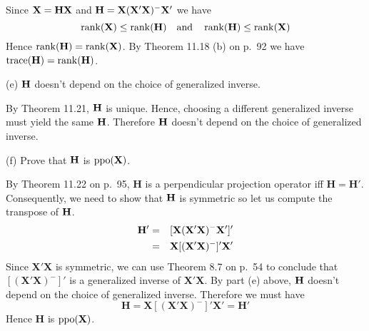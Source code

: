 \bigskip
\noindent
Since ${\bf X}={\bf HX}$ and
${\bf H}={\bf X}({\bf X}'{\bf X})^{-{}}{\bf X}'$ we have
$$
\mathop{\rm rank}({\bf X})\le
\mathop{\rm rank}({\bf H})\quad\hbox{and}\quad
\mathop{\rm rank}({\bf H})\le\mathop{\rm rank}({\bf X})
$$
Hence $\mathop{\rm rank}({\bf H})=\mathop{\rm rank}({\bf X})$.
By Theorem 11.18 (b) on p.\ 92 we have
$\mathop{\rm trace}({\bf H})=\mathop{\rm rank}({\bf H})$.

\bigskip
\noindent
(e) $\bf H$ doesn't depend on the choice of generalized inverse.

\bigskip
\noindent
By Theorem 11.21, $\bf H$ is unique. Hence, choosing a different generalized inverse
must yield the same $\bf H$.
Therefore $\bf H$ doesn't depend on the choice of generalized inverse.

\bigskip
\noindent
(f) Prove that $\bf H$ is $\mathop{\rm ppo}({\bf X})$.

\bigskip
\noindent
By Theorem 11.22 on p.\ 95, $\mathbf H$ is a perpendicular projection
operator iff $\mathbf H=\mathbf H'$. Consequently,
we need to show that $\bf H$ is symmetric so let us compute the
transpose of $\bf H$.
\begin{eqnarray*}
\mathbf H'&=&[{\bf X}({\bf X}'{\bf X})^{-{}}{\bf X}']'\\
&=&\mathbf X[(\mathbf X'\mathbf X)^{-{}}]'\mathbf X'
\end{eqnarray*}
Since $\mathbf X'\mathbf X$ is symmetric, we can use Theorem 8.7
on p.\ 54 to conclude that
$[(\mathbf X'\mathbf X)^{-{}}]'$ is a generalized inverse of
$\mathbf X'\mathbf X$.
By part (e) above, $\bf H$ doesn't depend on the choice of generalized inverse.
Therefore we must have
$$\mathbf H=\mathbf X[(\mathbf X'\mathbf X)^{-{}}]'\mathbf X'=
\mathbf H'$$
Hence $\mathbf H$ is $\mathop{\rm ppo}(\mathbf X)$.

